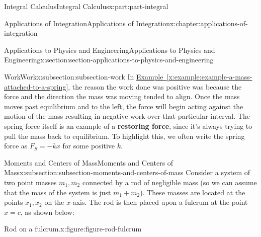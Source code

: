 \documentclass[twoside,10pt,]{book}
\newcommand{\xreffont}{\relax}
\newcommand{\terminology}[1]{\textbf{#1}}
\numberwithin{equation}{part}
\begin{document}
\begin{partptx}{Integral Calculus}{}{Integral Calculus}{}{}{x:part:part-integral}
\begin{chapterptx}{Applications of Integration}{}{Applications of Integration}{}{}{x:chapter:applications-of-integration}
\begin{sectionptx}{Applications to Physics and Engineering}{}{Applications to Physics and Engineering}{}{}{x:section:section-applications-to-physics-and-engineering}
\begin{subsectionptx}{Work}{}{Work}{}{}{x:subsection:subsection-work}
In \hyperref[x:example:example-a-mass-attached-to-a-spring]{Example~{\xreffont\ref{x:example:example-a-mass-attached-to-a-spring}}}, the reason the work done was positive was because the force and the direction the mass was moving tended to align. Once the mass moves past equilibrium and to the left, the force will begin acting against the motion of the mass resulting in negative work over that particular interval. The spring force itself is an example of a \terminology{restoring force}, since it's always trying to pull the mass back to equilibrium. To highlight this, we often write the spring force as \(F_{S} = -kx\) for some positive \(k\).%
\end{subsectionptx}
%
%
\typeout{************************************************}
\typeout{************************************************}
%
\begin{subsectionptx}{Moments and Centers of Mass}{}{Moments and Centers of Mass}{}{}{x:subsection:subsection-moments-and-centers-of-mass}
Consider a system of two point masses \(m_{1},m_{2}\) connected by a rod of negligible mass (so we can assume that the mass of the system is just \(m_{1}+m_{2}\)). These masses are located at the points \(x_{1},x_{2}\) on the \(x\)-axis. The rod is then placed upon a fulcrum at the point \(x=c\), as shown below:%
\begin{figureptx}{Rod on a fulcrum.}{x:figure:figure-rod-fulcrum}{}%
\begin{image}{0}{1}{0}%
\end{image}
\end{figureptx}
\end{subsectionptx}
\end{sectionptx}
\end{chapterptx}
\end{partptx}
\end{document}

